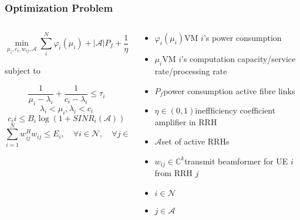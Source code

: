 \documentclass[usenames,dvipsnames]{beamer}
\begin{document}
\begin{frame}
  \frametitle{Optimization Problem}
  \vspace*{-2.5\baselineskip}
  \begin{columns}[t]
    \begin{column}{0.62\linewidth}
  \begin{exampleblock}{}
   \[
     \min_{\mu_{i},c_{i},w_{ij},\mathcal{A}}\sum_{i}^{N}\varphi_{i}(\mu_{i}) + \lvert\mathcal{A}\rvert P_{f} + \frac{1}{\eta}\sum_{i = 1}^{N}\sum_{j\in{A}}w_{ij}^{H}w_{ij}
   \]
  \end{exampleblock}
  subject to
  \begin{exampleblock}{}
    \[
      \frac{1}{\mu_{i}- \lambda_{i}} + \frac{1}{c_{i} - \lambda_{i}}\leq\tau_{i}
    \]
    \[
      \lambda_{i} < \mu_{i},\lambda_{i}<c_{i}
  \]
  \[
    c_i{i} \leq B_{i}\log(1+SINR_{i}(\mathcal{A}))
  \]
  \[
    \sum_{i=1}^{N}w_{ij}^{H}w_{ij}\leq E_{i},\quad \forall i\in \mathcal{N}, \quad \forall j\in \mathcal{L}
  \]
  \end{exampleblock}
\end{column}
\begin{column}{0.38\linewidth}
  \footnotesize\raggedright
  \begin{itemize}
    \item $\varphi_{i}(\mu_{i})$\quad VM $i$'s power consumption
    \item $\mu_{i}$\qquad VM $i$'s computation capacity/service rate/processing rate
    \item $P_{f}$\qquad power consumption active fibre links
    \item $\eta\in(0,1)$\quad ineffficiency coefficient amplifier in RRH
    \item $\mathcal{A}$\qquad set of active RRHs
    \item $w_{ij}\in\mathbb{C}^{k}$\quad transmit beamformer for UE $i$ from RRH $j$
    \item $i\in\mathcal{N}$
    \item $j\in\mathcal{A}$
  \end{itemize}
\end{column}
\end{columns}
\end{frame}
\end{document}
